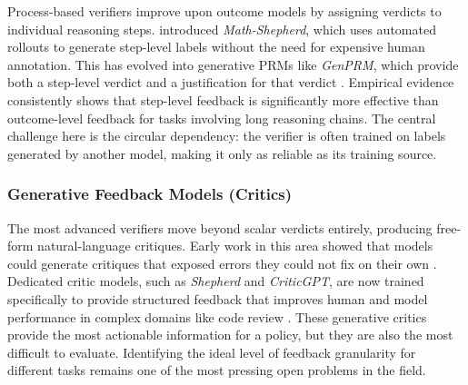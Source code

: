 Process-based verifiers improve upon outcome models by assigning verdicts to individual reasoning steps. \citet{wang2024mathshepherd} introduced \textit{Math-Shepherd}, which uses automated rollouts to generate step-level labels without the need for expensive human annotation. This has evolved into generative PRMs like \textit{GenPRM}, which provide both a step-level verdict and a justification for that verdict \citep{zhao2025genprm}. Empirical evidence consistently shows that step-level feedback is significantly more effective than outcome-level feedback for tasks involving long reasoning chains. The central challenge here is the circular dependency: the verifier is often trained on labels generated by another model, making it only as reliable as its training source.


\subsubsection{Generative Feedback Models (Critics)}

The most advanced verifiers move beyond scalar verdicts entirely, producing free-form natural-language critiques. Early work in this area showed that models could generate critiques that exposed errors they could not fix on their own \citep{saunders2022selfcritiquing}. Dedicated critic models, such as \textit{Shepherd} and \textit{CriticGPT}, are now trained specifically to provide structured feedback that improves human and model performance in complex domains like code review \citep{wang2023shepherd, mcaleese2024criticgpt}. These generative critics provide the most actionable information for a policy, but they are also the most difficult to evaluate. Identifying the ideal level of feedback granularity for different tasks remains one of the most pressing open problems in the field.

